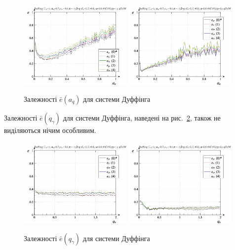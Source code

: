 \begin{figure}[ht!]
\begin{center}
  \includegraphics[width=0.49\textwidth]{p/cha/duff/duff_id-p_a_q_sign.png}
  \hfill
  \includegraphics[width=0.49\textwidth]{p/cha/duff/duff_id-p_a_q_sin.png}
\end{center}
\caption{Залежності $ \bar{e} (a_q) $ для системи Дуффінга}
\label{atu:f:duff_e_a_q}
\end{figure}

Залежності
$ \bar{e} (q_\gamma) $ для системи Дуффінга, наведені на
рис.~\ref{atu:f:duff_e_q_gamma}, також не виділяються нічим особливим.

\begin{figure}[ht!]
\begin{center}
  \includegraphics[width=0.49\textwidth]{p/cha/duff/duff_id-p_q_gamma_sign.png}
  \hfill
  \includegraphics[width=0.49\textwidth]{p/cha/duff/duff_id-p_q_gamma_sin.png}
\end{center}
\caption{Залежності $ \bar{e} (q_\gamma) $ для системи Дуффінга}
\label{atu:f:duff_e_q_gamma}
\end{figure}

